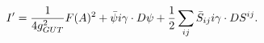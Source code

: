 \begin{equation}\label{orbkin}
I'={1\over 4 g_{GUT}^2}F(A)^2+ \bar\psi i\gamma\cdot D\psi
+{1\over 2}\sum_{ij}\bar S_{ij} i\gamma\cdot D S^{ij}.
\end{equation}


